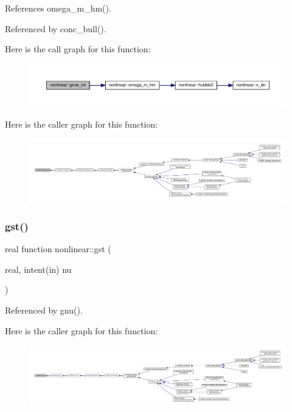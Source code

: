 References omega\+\_\+m\+\_\+hm().



Referenced by conc\+\_\+bull().

Here is the call graph for this function\+:
\nopagebreak
\begin{figure}[H]
\begin{center}
\leavevmode
\includegraphics[width=350pt]{namespacenonlinear_a2ccd15402588e67b26abc93ccf910de6_cgraph}
\end{center}
\end{figure}
Here is the caller graph for this function\+:
\nopagebreak
\begin{figure}[H]
\begin{center}
\leavevmode
\includegraphics[width=350pt]{namespacenonlinear_a2ccd15402588e67b26abc93ccf910de6_icgraph}
\end{center}
\end{figure}
\mbox{\label{namespacenonlinear_a5eea788fe3f505d256438cee66af3240}} 
\subsubsection{\texorpdfstring{gst()}{gst()}}
{\footnotesize\ttfamily real function nonlinear\+::gst (\begin{DoxyParamCaption}\item[{real, intent(in)}]{nu }\end{DoxyParamCaption})\hspace{0.3cm}{\ttfamily [private]}}



Referenced by gnu().

Here is the caller graph for this function\+:
\nopagebreak
\begin{figure}[H]
\begin{center}
\leavevmode
\includegraphics[width=350pt]{namespacenonlinear_a5eea788fe3f505d256438cee66af3240_icgraph}
\end{center}
\end{figure}
\mbox{\label{namespacenonlinear_a76e8738685b7ce5757290a6441d5e850}} 
